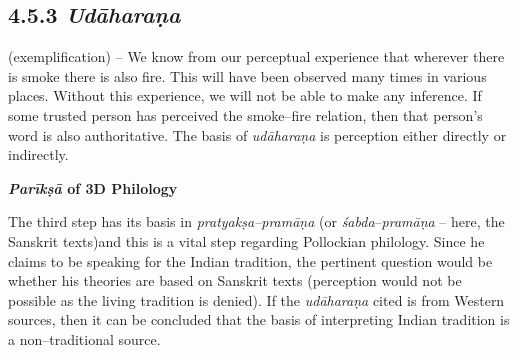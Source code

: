\vspace{-.3cm}

\subsection*{4.5.3 {\it {\bfseries Udāharaṇa}}}
\vspace{-.2cm}

(exemplification) – We know from our perceptual experience that wherever there is smoke there is also fire. This will have been observed many times in various places. Without this experience, we will not be able to make any inference. If some trusted person has perceived the smoke–fire relation, then that person’s word is also authoritative. The basis of \textit{udāharaṇa }is perception either directly or indirectly.

\textbf{\textit{Parīkṣā} of 3D Philology}

The third step has its basis in \textit{pratyakṣa–pramāṇa} (or \textit{śabda}–\textit{pramāṇa} – here, the Sanskrit texts)and this is a vital step regarding Pollockian philology. Since he claims to be speaking for the Indian tradition, the pertinent question would be whether his theories are based on Sanskrit texts (perception would not be possible as the living tradition is denied). If the\textit{ udāharaṇa }cited is from Western sources, then it can be concluded that the basis of interpreting Indian tradition is a non–traditional source.

